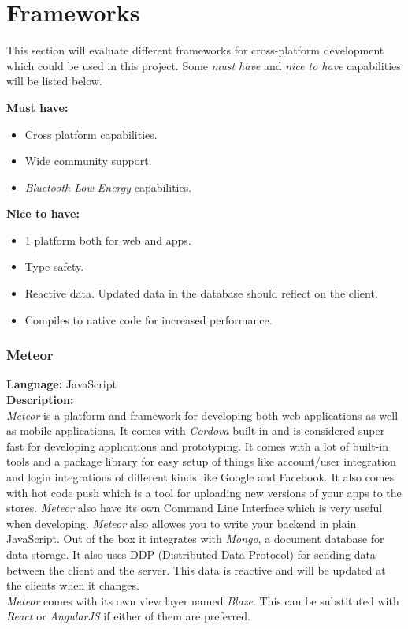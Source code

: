 \section{Frameworks}

This section will evaluate different frameworks for cross-platform development which could be used in this project. Some \textit{must have} and \textit{nice to have} capabilities will be listed below.
	
\textbf{Must have:}
	\begin{itemize}
	\item Cross platform capabilities.
	\item Wide community support.
	\item \textit{Bluetooth Low Energy} capabilities.
	\end{itemize}
	
\textbf{Nice to have:}
	
	\begin{itemize}
	\item 1 platform both for web and apps.
	\item Type safety.
	\item Reactive data. Updated data in the database should reflect on the client.
	\item Compiles to native code for increased performance.
	\end{itemize}
	

\subsubsection{Meteor}

\textbf{Language:} JavaScript
\\
\textbf{Description:}
\\
\textit{Meteor} is a platform and framework for developing both web applications as well as mobile applications. It comes with \textit{Cordova} built-in and is considered super fast for developing applications and prototyping. It comes with a lot of built-in tools and a package library for easy setup of things like account/user integration and login integrations of different kinds like Google and Facebook. It also comes with hot code push which is a tool for uploading new versions of your apps to the stores. \textit{Meteor} also have its own Command Line Interface which is very useful when developing. \textit{Meteor} also allowes you to write your backend in plain JavaScript. Out of the box it integrates with \textit{Mongo}, a document database for data storage. It also uses DDP (Distributed Data Protocol) for sending data between the client and the server. This data is reactive and will be updated at the clients when it changes.
\\
\textit{Meteor} comes with its own view layer named \textit{Blaze}. This can be substituted with \textit{React} or \textit{AngularJS} if either of them are preferred.


